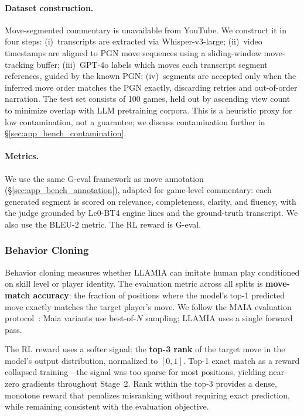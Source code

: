\paragraph{Dataset construction.}
Move-segmented commentary is unavailable from YouTube. We construct it in four steps: (i)~transcripts are extracted via Whisper-v3-large; (ii)~video timestamps are aligned to PGN move sequences using a sliding-window move-tracking buffer; (iii)~GPT-4o labels which moves each transcript segment references, guided by the known PGN; (iv)~segments are accepted only when the inferred move order matches the PGN exactly, discarding retries and out-of-order narration. The test set consists of 100 games, held out by ascending view count to minimize overlap with LLM pretraining corpora. This is a heuristic proxy for low contamination, not a guarantee; we discuss contamination further in \S\ref{sec:app_bench_contamination}.

\paragraph{Metrics.}
We use the same G-eval framework as move annotation (\S\ref{sec:app_bench_annotation}), adapted for game-level commentary: each generated segment is scored on relevance, completeness, clarity, and fluency, with the judge grounded by Lc0-BT4 engine lines and the ground-truth transcript. We also use the BLEU-2 metric. The RL reward is G-eval.

\subsubsection{Behavior Cloning}
\label{sec:app_bench_bc}

Behavior cloning measures whether LLAMIA can imitate human play conditioned on skill level or player identity. The evaluation metric across all splits is \textbf{move-match accuracy}: the fraction of positions where the model's top-1 predicted move exactly matches the target player's move. We follow the MAIA evaluation protocol~\citep{mcilroy2020aligning}: Maia variants use best-of-$N$ sampling; LLAMIA uses a single forward pass.

The RL reward uses a softer signal: the \textbf{top-3 rank} of the target move in the model's output distribution, normalized to $[0,1]$. Top-1 exact match as a reward collapsed training---the signal was too sparse for most positions, yielding near-zero gradients throughout Stage~2. Rank within the top-3 provides a dense, monotone reward that penalizes misranking without requiring exact prediction, while remaining consistent with the evaluation objective.


